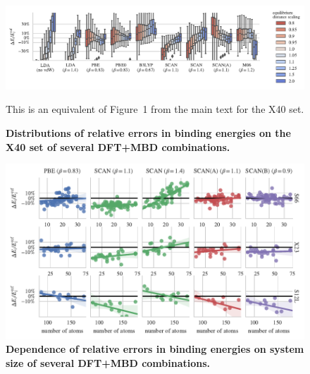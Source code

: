 \documentclass[twocolumn]{article}
\begin{document}
\begin{figure}
\includegraphics[center]{../media/x40-dists}
\caption{\textbf{Distributions of relative errors in binding energies on the  X40 set of several DFT+MBD combinations.}
}\label{fig:x40-dists}
This is an equivalent of Figure~1 from the main text for the X40 set.
\end{figure}

\begin{figure}
\includegraphics[center]{../media/size-dependence}
\caption{\textbf{Dependence of relative errors in binding energies on system size of several DFT+MBD combinations.}
}\label{fig:size-dependence}
\end{figure}
\end{document}
